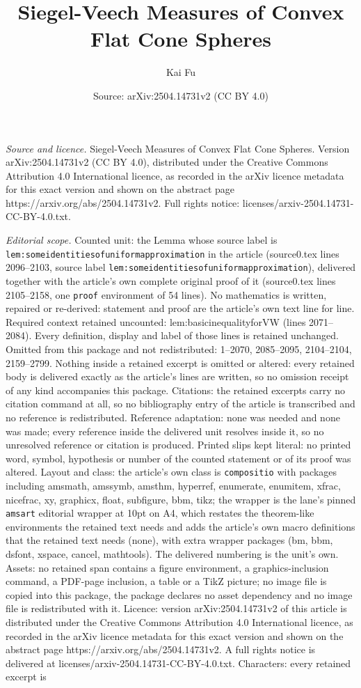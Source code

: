 \documentclass[10pt,a4paper]{amsart}
\title[Siegel-Veech Measures of Convex Flat Cone Spheres]{Siegel-Veech Measures of Convex Flat Cone Spheres}
\author{Kai Fu}
\date{Source: arXiv:2504.14731v2 (CC BY 4.0)}
\begin{document}
\maketitle

\noindent\emph{Source and licence.} Siegel-Veech Measures of Convex Flat Cone Spheres. Version arXiv:2504.14731v2 (CC BY 4.0), distributed under the Creative Commons Attribution 4.0 International licence, as recorded in the arXiv licence metadata for this exact version and shown on the abstract page https://arxiv.org/abs/2504.14731v2. Full rights notice: licenses/arxiv-2504.14731-CC-BY-4.0.txt.\par\smallskip

\noindent\textit{Editorial scope.} Counted unit: the Lemma whose source label is \texttt{lem:someidentitiesofuniformapproximation} in the article (source0.tex lines 2096--2103, source label \texttt{lem:someidentitiesofuniformapproximation}), delivered together with the article's own complete original proof of it (source0.tex lines 2105--2158, one \texttt{proof} environment of 54 lines). No mathematics is written, repaired or re-derived: statement and proof are the article's own text line for line. Required context retained uncounted: lem:basicinequalityforVW (lines 2071--2084). Every definition, display and label of those lines is retained unchanged. Omitted from this package and not redistributed: 1--2070, 2085--2095, 2104--2104, 2159--2799. Nothing inside a retained excerpt is omitted or altered: every retained body is delivered exactly as the article's lines are written, so no omission receipt of any kind accompanies this package. Citations: the retained excerpts carry no citation command at all, so no bibliography entry of the article is transcribed and no reference is redistributed. Reference adaptation: none was needed and none was made; every reference inside the delivered unit resolves inside it, so no unresolved reference or citation is produced. Printed slips kept literal: no printed word, symbol, hypothesis or number of the counted statement or of its proof was altered. Layout and class: the article's own class is \texttt{compositio} with packages including amsmath, amssymb, amsthm, hyperref, enumerate, enumitem, xfrac, nicefrac, xy, graphicx, float, subfigure, bbm, tikz; the wrapper is the lane's pinned \texttt{amsart} editorial wrapper at 10pt on A4, which restates the theorem-like environments the retained text needs and adds the article's own macro definitions that the retained text needs (none), with extra wrapper packages (bm, bbm, dsfont, xspace, cancel, mathtools). The delivered numbering is the unit's own. Assets: no retained span contains a figure environment, a graphics-inclusion command, a PDF-page inclusion, a table or a TikZ picture; no image file is copied into this package, the package declares no asset dependency and no image file is redistributed with it. Licence: version arXiv:2504.14731v2 of this article is distributed under the Creative Commons Attribution 4.0 International licence, as recorded in the arXiv licence metadata for this exact version and shown on the abstract page https://arxiv.org/abs/2504.14731v2. A full rights notice is delivered at licenses/arxiv-2504.14731-CC-BY-4.0.txt. Characters: every retained excerpt is 
\end{document}
